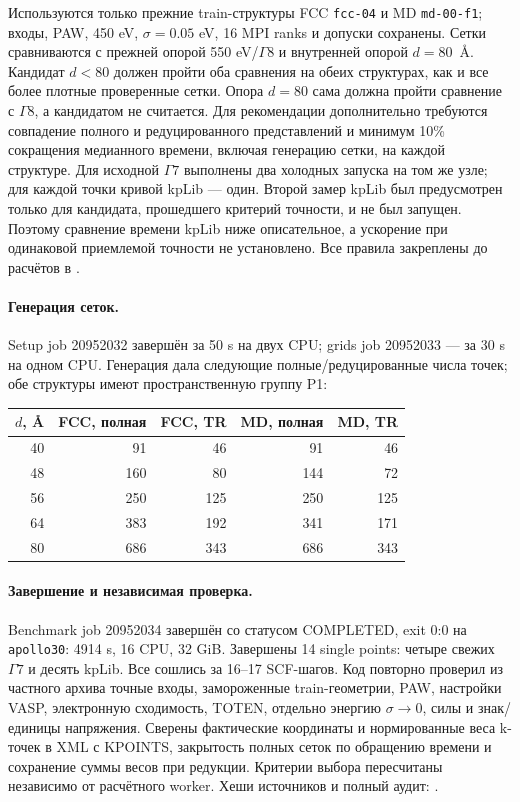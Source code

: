 \documentclass[11pt,a4paper]{article}
\begin{document}
Используются только прежние train-структуры FCC \texttt{fcc-04}
и MD \texttt{md-00-f1}; входы, PAW, 450 eV, $\sigma=0.05$ eV,
16 MPI ranks и допуски сохранены. Сетки сравниваются с прежней опорой
550 eV/$\Gamma8$ и внутренней опорой $d=80$~\AA.
Кандидат $d<80$ должен пройти оба сравнения на обеих структурах,
как и все более плотные проверенные сетки. Опора $d=80$ сама должна
пройти сравнение с $\Gamma8$, а кандидатом не считается.
Для рекомендации дополнительно требуются совпадение полного и
редуцированного представлений и минимум 10\% сокращения медианного
времени, включая генерацию сетки, на каждой структуре.
Для исходной $\Gamma7$ выполнены два холодных запуска на том же узле;
для каждой точки кривой kpLib --- один. Второй замер kpLib был
предусмотрен только для кандидата, прошедшего критерий точности,
и не был запущен. Поэтому сравнение времени kpLib ниже описательное,
а ускорение при одинаковой приемлемой точности не установлено.
Все правила закреплены до расчётов в
.

\paragraph{Генерация сеток.}
Setup job 20952032 завершён за 50 s на двух CPU; grids job 20952033
--- за 30 s на одном CPU. Генерация дала следующие полные/редуцированные
числа точек; обе структуры имеют пространственную группу P1:
\begin{center}
\begin{tabular}{rrrrr}
\toprule
$d$, \AA & FCC, полная & FCC, TR & MD, полная & MD, TR\\
\midrule
40 & 91 & 46 & 91 & 46\\
48 & 160 & 80 & 144 & 72\\
56 & 250 & 125 & 250 & 125\\
64 & 383 & 192 & 341 & 171\\
80 & 686 & 343 & 686 & 343\\
\bottomrule
\end{tabular}
\end{center}
\paragraph{Завершение и независимая проверка.}
Benchmark job 20952034 завершён со статусом COMPLETED, exit 0:0
на \texttt{apollo30}: 4914 s, 16 CPU, 32 GiB.
Завершены 14 single points: четыре свежих $\Gamma7$ и десять kpLib.
Все сошлись за 16--17 SCF-шагов. Код
 повторно проверил из частного
архива точные входы, замороженные train-геометрии, PAW, настройки VASP,
электронную сходимость, TOTEN, отдельно энергию $\sigma\to0$,
силы и знак/единицы напряжения. Сверены фактические координаты и
нормированные веса k-точек в XML с KPOINTS, закрытость полных сеток
по обращению времени и сохранение суммы весов при редукции.
Критерии выбора пересчитаны независимо от расчётного worker.
Хеши источников и полный аудит:
.
\end{document}
